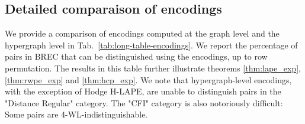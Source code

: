 \newpage


\subsection{Detailed comparaison of encodings}\label{appendix-detailed-comparaison}

We provide a comparison of encodings computed at the graph level and the hypergraph level in Tab.~\ref{tab:long-table-encodings}. We report the percentage of pairs in BREC that can be distinguished using the encodings, up to row permutation. The results in this table further illustrate theorems \ref{thm:lape_exp}, \ref{thm:rwpe_exp} and \ref{thm:hcp_exp}. We note that hypergraph-level encodings, with the exception of Hodge H-LAPE, are unable to distinguish pairs in the "Distance Regular" category. The "CFI" category is also notoriously difficult: Some pairs are 4-WL-indistinguishable.



